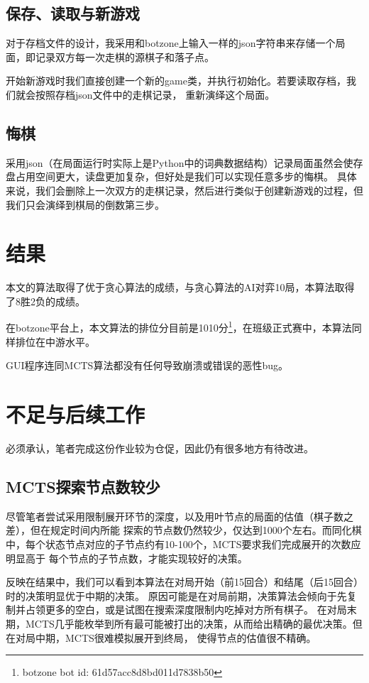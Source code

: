 \documentclass[12pt]{ctexart}
\begin{document}
	\subsection{保存、读取与新游戏}
	对于存档文件的设计，我采用和botzone上输入一样的json字符串来存储一个局面，即记录双方每一次走棋的源棋子和落子点。

	开始新游戏时我们直接创建一个新的\textsf{game}类，并执行初始化。若要读取存档，我们就会按照存档json文件中的走棋记录，
	重新演绎这个局面。

	\subsection{悔棋}
	采用json（在局面运行时实际上是Python中的词典数据结构）记录局面虽然会使存盘占用空间更大，读盘更加复杂，但好处是我们可以实现任意多步的悔棋。
	具体来说，我们会删除上一次双方的走棋记录，然后进行类似于创建新游戏的过程，但我们只会演绎到棋局的倒数第三步。

	\section{结果}
	本文的算法取得了优于贪心算法的成绩，与贪心算法的AI对弈10局，本算法取得了8胜2负的成绩。

	在botzone平台上，本文算法的排位分目前是1010分\footnote{botzone bot id: 61d57acc8d8bd011d7838b50}，在班级正式赛中，本算法同样排位在中游水平。

	GUI程序连同MCTS算法都没有任何导致崩溃或错误的恶性bug。

	\section{不足与后续工作}
	必须承认，笔者完成这份作业较为仓促，因此仍有很多地方有待改进。

	\subsection{MCTS探索节点数较少}
	尽管笔者尝试采用限制展开环节的深度，以及用叶节点的局面的估值（棋子数之差），但在规定时间内所能
	探索的节点数仍然较少，仅达到1000个左右。而同化棋中，每个状态节点对应的子节点约有10-100个，MCTS要求我们完成展开的次数应明显高于
	每个节点的子节点数，才能实现较好的决策。

	反映在结果中，我们可以看到本算法在对局开始（前15回合）和结尾（后15回合）时的决策明显优于中期的决策。
	原因可能是在对局前期，决策算法会倾向于先复制并占领更多的空白，或是试图在搜索深度限制内吃掉对方所有棋子。
	在对局末期，MCTS几乎能枚举到所有最可能被打出的决策，从而给出精确的最优决策。但在对局中期，MCTS很难模拟展开到终局，
	使得节点的估值很不精确。
\end{document}

